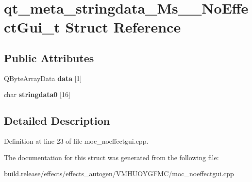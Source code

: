 \hypertarget{structqt__meta__stringdata___ms_____no_effect_gui__t}{}\section{qt\+\_\+meta\+\_\+stringdata\+\_\+\+Ms\+\_\+\+\_\+\+No\+Effect\+Gui\+\_\+t Struct Reference}
\label{structqt__meta__stringdata___ms_____no_effect_gui__t}
\subsection*{Public Attributes}
\begin{DoxyCompactItemize}
\item 
\mbox{\label{structqt__meta__stringdata___ms_____no_effect_gui__t_afab6d600f2bdbd5fdb5b3b11b9077274}} 
Q\+Byte\+Array\+Data {\bfseries data} \mbox{[}1\mbox{]}
\item 
\mbox{\label{structqt__meta__stringdata___ms_____no_effect_gui__t_a4dd0c1091337e52c6ee99fd5e796c7af}} 
char {\bfseries stringdata0} \mbox{[}16\mbox{]}
\end{DoxyCompactItemize}


\subsection{Detailed Description}


Definition at line 23 of file moc\+\_\+noeffectgui.\+cpp.



The documentation for this struct was generated from the following file\+:\begin{DoxyCompactItemize}
\item 
build.\+release/effects/effects\+\_\+autogen/\+V\+M\+H\+U\+O\+Y\+G\+F\+M\+C/moc\+\_\+noeffectgui.\+cpp\end{DoxyCompactItemize}
